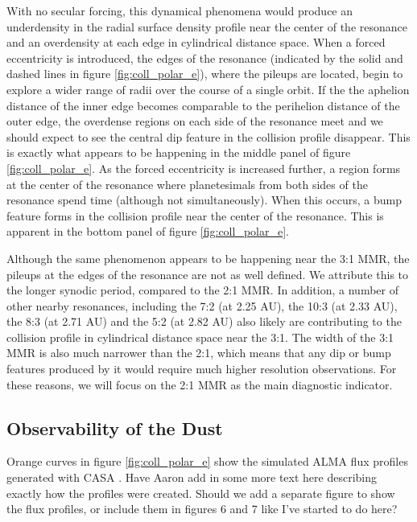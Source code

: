 \documentclass[twocolumn]{aastex63}
\begin{document}
With no secular forcing, this dynamical phenomena would produce an underdensity in the radial surface density profile near the center of the 
resonance and an overdensity at each edge in cylindrical distance space. When a forced eccentricity is introduced, the edges of the resonance 
(indicated by the solid and dashed lines in figure \ref{fig:coll_polar_e}), where the pileups are located, begin to explore a wider range of radii over the 
course of a single orbit. If the the aphelion distance of the inner edge becomes comparable to the perihelion distance of the outer edge, the 
overdense regions on each side of the resonance meet and we should expect to see the central dip feature in the collision profile disappear. This is 
exactly what appears to be happening in the middle panel of figure \ref{fig:coll_polar_e}. As the forced eccentricity is increased further, a region 
forms at the center of the resonance where planetesimals from both sides of the resonance spend time (although not simultaneously). When this 
occurs, a bump feature forms in the collision profile near the center of the resonance. This is apparent in the bottom panel of figure 
\ref{fig:coll_polar_e}.

Although the same phenomenon appears to be happening near the 3:1 MMR, the pileups at the edges of the resonance are not as well defined. We 
attribute this to the longer synodic period, compared to the 2:1 MMR. In addition, a number of other nearby resonances, including the 7:2 (at 2.25 
AU), the 10:3 (at 2.33 AU), the 8:3 (at 2.71 AU) and the 5:2 (at 2.82 AU) also likely are contributing to the collision profile in cylindrical distance 
space near the 3:1. The width of the 3:1 MMR is also much narrower than the 2:1, which means that any dip or bump features produced by it would 
require much higher resolution observations. For these reasons, we will focus on the 2:1 MMR as the main diagnostic indicator.

\subsection{Observability of the Dust}

Orange curves in figure \ref{fig:coll_polar_e} show the simulated ALMA flux profiles generated with {\sc CASA} \citep{2007ASPC..376..127M}. Have 
Aaron add in some more text here describing exactly how the profiles were created. Should we add a separate figure to show the flux profiles, or 
include them in figures 6 and 7 like I've started to do here?
\end{document}
